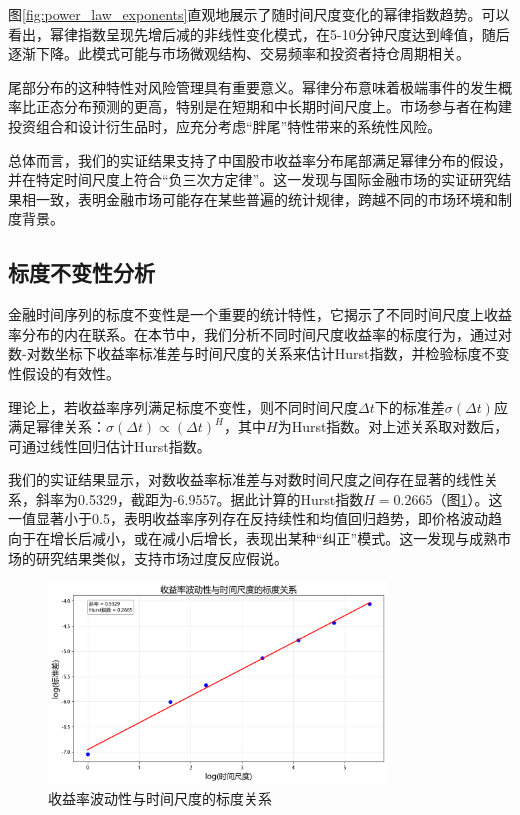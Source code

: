 \documentclass[12pt, a4paper]{article}
\begin{document}
图\ref{fig:power_law_exponents}直观地展示了随时间尺度变化的幂律指数趋势。可以看出，幂律指数呈现先增后减的非线性变化模式，在5-10分钟尺度达到峰值，随后逐渐下降。此模式可能与市场微观结构、交易频率和投资者持仓周期相关。

尾部分布的这种特性对风险管理具有重要意义。幂律分布意味着极端事件的发生概率比正态分布预测的更高，特别是在短期和中长期时间尺度上。市场参与者在构建投资组合和设计衍生品时，应充分考虑“胖尾”特性带来的系统性风险。

总体而言，我们的实证结果支持了中国股市收益率分布尾部满足幂律分布的假设，并在特定时间尺度上符合“负三次方定律”。这一发现与国际金融市场的实证研究结果相一致，表明金融市场可能存在某些普遍的统计规律，跨越不同的市场环境和制度背景。

\subsection{标度不变性分析}

金融时间序列的标度不变性是一个重要的统计特性，它揭示了不同时间尺度上收益率分布的内在联系。在本节中，我们分析不同时间尺度收益率的标度行为，通过对数-对数坐标下收益率标准差与时间尺度的关系来估计Hurst指数，并检验标度不变性假设的有效性。

理论上，若收益率序列满足标度不变性，则不同时间尺度$\Delta t$下的标准差$\sigma(\Delta t)$应满足幂律关系：$\sigma(\Delta t) \propto (\Delta t)^H$，其中$H$为Hurst指数。对上述关系取对数后，可通过线性回归估计Hurst指数。

我们的实证结果显示，对数收益率标准差与对数时间尺度之间存在显著的线性关系，斜率为0.5329，截距为-6.9557。据此计算的Hurst指数$H = 0.2665$（图\ref{fig:scaling_relation}）。这一值显著小于0.5，表明收益率序列存在反持续性和均值回归趋势，即价格波动趋向于在增长后减小，或在减小后增长，表现出某种“纠正”模式。这一发现与成熟市场的研究结果类似，支持市场过度反应假说。

\begin{figure}[htbp]
\centering
\includegraphics[width=0.8\textwidth]{../assets/img/收益率波动性和时间尺度的关系.png}
\caption{收益率波动性与时间尺度的标度关系}
\label{fig:scaling_relation}
\end{figure}
\end{document}
